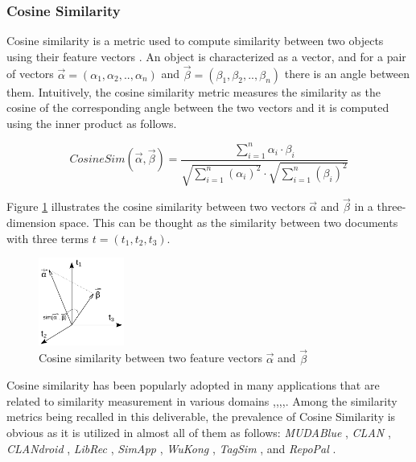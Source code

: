 \newpage
\subsubsection{Cosine Similarity}

Cosine similarity is a metric used to compute similarity between two objects using their feature vectors \cite{tversky1977features}. An object is characterized as a vector, and for a pair of vectors $\vec{\alpha}=(\alpha_{1},\alpha_{2},..,\alpha_{n})$ and $\vec{\beta}=(\beta_{1},\beta_{2},..,\beta_{n})$ there is an angle between them. Intuitively, the cosine similarity metric measures the similarity as the cosine of the corresponding angle between the two vectors and it is computed using the inner product as follows. 

\begin{equation} \label{eqn:Cosine}
CosineSim(\vec{\alpha},\vec{\beta}) = \frac{\sum_{i=1}^{n}\alpha_{i}\cdot \beta_{i}}{\sqrt{\sum_{i=1}^{n}(\alpha_{i})^{2} }\cdot \sqrt{\sum_{i=1}^{n}(\beta_{i})^{2}}}
\end{equation}

Figure \ref{fig:Cosine} illustrates the cosine similarity between two vectors $\vec{\alpha}$ and $\vec{\beta}$ in a three-dimension space. This can be thought as the similarity between two documents with three terms $t=(t_{1},t_{2},t_{3})$.

\begin{figure}[h!]
	\centering
	\includegraphics[width=0.25\textwidth]{images/Cosine.pdf}
	\caption{Cosine similarity between two feature vectors $\vec{\alpha}$ and $\vec{\beta}$}
	\label{fig:Cosine}
\end{figure}

Cosine similarity has been popularly adopted in many applications that are related to similarity measurement in various domains \cite{Huang:2012:LCD:2343876.2343884},\cite{Islam:2008:STS:1376815.1376819},\cite{Linden:2003:ARI:642462.642471},\cite{conf:iscis:MadylovaO09},\cite{Mihalcea:2006:CKM:1597538.1597662}. Among the similarity metrics being recalled in this deliverable, the prevalence of Cosine Similarity is obvious as it is utilized in almost all of them as follows: \textit{MUDABlue} \cite{10.1109/APSEC.2004.69}, \textit{CLAN} \cite{McMillan:2012:DSS:2337223.2337267}, \textit{CLANdroid} \cite{10.1109ICPC.2016.7503721}, \textit{LibRec} \cite{6671293}, \textit{SimApp} \cite{Chen:2015:SFD:2684822.2685305}, \textit{WuKong} \cite{Wang:2015:WSA:2771783.2771795}, \textit{TagSim} \cite{Lo:2012:DSA:2473496.2473616}, and \textit{RepoPal} \cite{10.1109/SANER.2017.7884605}.\\

